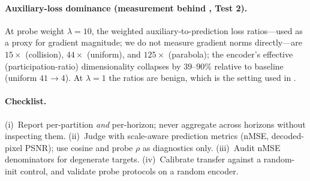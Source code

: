\paragraph{Auxiliary-loss dominance (measurement behind , Test 2).}
At probe weight $\lambda{=}10$, the weighted auxiliary-to-prediction loss ratios---used as a proxy for gradient magnitude; we do not measure gradient norms directly---are $15\times$ (collision), $44\times$ (uniform), and $125\times$ (parabola); the encoder's effective (participation-ratio) dimensionality collapses by $39$--$90\%$ relative to baseline (uniform $41\!\to\!4$). At $\lambda{=}1$ the ratios are benign, which is the setting used in .

\paragraph{Checklist.}
(i)~Report per-partition \emph{and} per-horizon; never aggregate across horizons without inspecting them. (ii)~Judge with scale-aware prediction metrics (nMSE, decoded-pixel PSNR); use cosine and probe $\rho$ as diagnostics only. (iii)~Audit nMSE denominators for degenerate targets. (iv)~Calibrate transfer against a random-init control, and validate probe protocols on a random encoder.
